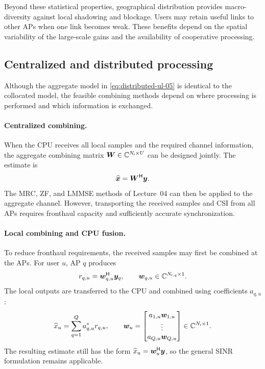 Beyond these statistical properties, geographical distribution provides macro-diversity against local shadowing and blockage. Users may retain useful links to other APs when one link becomes weak. These benefits depend on the spatial variability of the large-scale gains and the availability of cooperative processing.

\subsection{Centralized and distributed processing}
Although the aggregate model in \eqref{eq:distributed-ul-05} is identical to the collocated model, the feasible combining methods depend on where processing is performed and which information is exchanged.

\paragraph{Centralized combining.}
When the CPU receives all local samples and the required channel information, the aggregate combining matrix $\bm{W}\in\mathbb{C}^{N_{\mathsf{r}}\times U}$ can be designed jointly. The estimate is
\begin{equation*}
	\widehat{\bm{x}}={\bm{W}}^{\mathsf{H}}\bm{y}.
\end{equation*}
The MRC, ZF, and LMMSE methods of Lecture~04 can then be applied to the aggregate channel. However, transporting the received samples and CSI from all APs requires fronthaul capacity and sufficiently accurate synchronization.

\paragraph{Local combining and CPU fusion.}
To reduce fronthaul requirements, the received samples may first be combined at the APs. For user $u$, AP $q$ produces
\begin{equation}
	r_{q,u}={\bm{w}}^{\mathsf{H}}_{q,u}\bm{y}_q,
	\qquad
	\bm{w}_{q,u}\in\mathbb{C}^{N_{\mathsf r,q}\times1}.
	\label{eq:localcombining-05}
\end{equation}
The local outputs are transferred to the CPU and combined using coefficients $a_{q,u}$:
\begin{equation}
	\widehat x_u=\sum_{q=1}^{Q}a_{q,u}^*r_{q,u},
	\qquad
	\bm{w}_u=
	\begin{bmatrix}
		a_{1,u}\bm{w}_{1,u}\\
		\vdots\\
		a_{Q,u}\bm{w}_{Q,u}
	\end{bmatrix}
	\in\mathbb{C}^{N_{\mathsf{r}}\times1}.
	\label{eq:twostage-05}
\end{equation}
The resulting estimate still has the form $\widehat x_u={\bm{w}}^{\mathsf{H}}_u\bm{y}$, so the general SINR formulation remains applicable.


